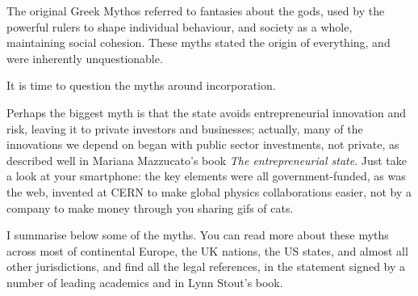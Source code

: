The original Greek Mythos referred to fantasies about the gods, used by the powerful rulers to shape individual behaviour, and society as a whole, maintaining social cohesion. These myths stated the origin of everything, and were inherently unquestionable.


It is time to question the myths around incorporation.


Perhaps the biggest myth is that the state avoids entrepreneurial innovation and risk, leaving it to private investors and businesses; actually, many of the innovations we depend on began with public sector investments, not private, as described well in Mariana Mazzucato’s book \emph{The entrepreneurial state}\cite{mazzucato-entrepreneurial-state}. Just take a look at your smartphone: the key elements were all government-funded, as was the web, invented at CERN to make global physics collaborations easier, not by a company to make money through you sharing gifs of cats. 


I summarise below some of the myths. You can read more about these myths across most of continental Europe, the UK nations, the US states, and almost all other jurisdictions, and find all the legal references, in the statement signed by a number of leading academics\cite{veldman-modern-law} and in Lynn Stout's book\cite{stout-shareholder}.


